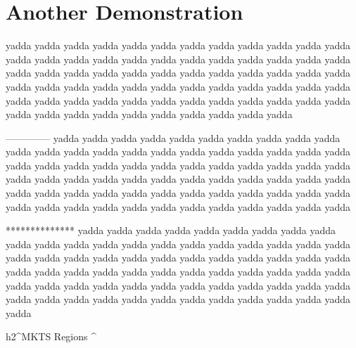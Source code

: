 \chapter{Another Demonstration
}
\begin{multicols}{2}yadda yadda yadda yadda yadda yadda yadda yadda yadda yadda
yadda yadda yadda yadda yadda yadda yadda yadda yadda yadda
yadda yadda yadda yadda yadda yadda yadda yadda yadda yadda
yadda yadda yadda yadda yadda yadda yadda yadda yadda yadda
yadda yadda yadda yadda yadda yadda yadda yadda yadda yadda
yadda yadda yadda yadda yadda yadda yadda yadda yadda yadda
yadda yadda yadda yadda yadda yadda yadda yadda yadda yadda\mktsShowpar\par

--------------
yadda yadda yadda yadda yadda yadda yadda yadda yadda yadda
yadda yadda yadda yadda yadda yadda yadda yadda yadda yadda
yadda yadda yadda yadda yadda yadda yadda yadda yadda yadda
yadda yadda yadda yadda yadda yadda yadda yadda yadda yadda
yadda yadda yadda yadda yadda yadda yadda yadda yadda yadda
yadda yadda yadda yadda yadda yadda yadda yadda yadda yadda
yadda yadda yadda yadda yadda yadda yadda yadda yadda yadda\mktsShowpar\par

**************
yadda yadda yadda yadda yadda yadda yadda yadda yadda yadda
yadda yadda yadda yadda yadda yadda yadda yadda yadda yadda
yadda yadda yadda yadda yadda yadda yadda yadda yadda yadda
yadda yadda yadda yadda yadda yadda yadda yadda yadda yadda
yadda yadda yadda yadda yadda yadda yadda yadda yadda yadda
yadda yadda yadda yadda yadda yadda yadda yadda yadda yadda
yadda yadda yadda yadda yadda yadda yadda yadda yadda yadda\mktsShowpar\par
{}h2\textasciicircum{}MKTS Regions \textasciicircum{}\end{multicols}
